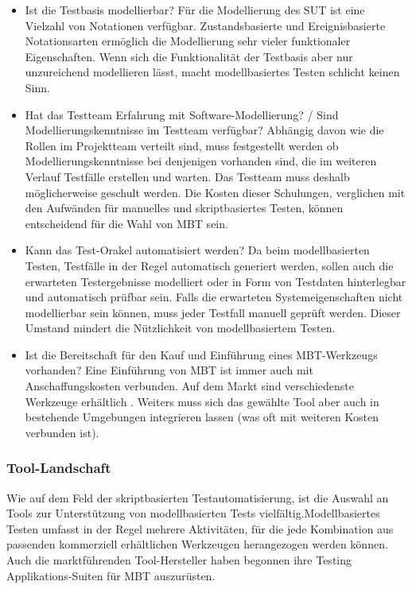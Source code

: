 \begin{itemize}
\item Ist die Testbasis modellierbar?
Für die Modellierung des SUT ist eine Vielzahl von Notationen verfügbar. Zustandsbasierte und Ereignisbasierte  Notationsarten ermöglich die Modellierung sehr vieler funktionaler Eigenschaften. Wenn sich die Funktionalität der Testbasis aber nur unzureichend modellieren lässt, macht modellbasiertes Testen schlicht keinen Sinn.
\item Hat das Testteam Erfahrung mit Software-Modellierung? / Sind Modellierungskenntnisse im Testteam verfügbar?
Abhängig davon wie die Rollen im Projektteam verteilt sind, muss festgestellt werden ob Modellierungskenntnisse bei denjenigen vorhanden sind, die im weiteren Verlauf Testfälle erstellen und warten. Das Testteam muss deshalb möglicherweise geschult werden. Die Kosten dieser Schulungen, verglichen mit den Aufwänden für manuelles und skriptbasiertes Testen, können entscheidend für die Wahl von MBT sein.
\item Kann das Test-Orakel automatisiert werden?
Da beim modellbasierten Testen, Testfälle in der Regel automatisch generiert werden, sollen auch die erwarteten Testergebnisse modelliert oder in Form von Testdaten hinterlegbar und automatisch prüfbar sein. Falls die erwarteten Systemeigenschaften nicht modellierbar sein können, muss jeder Testfall manuell geprüft werden. Dieser Umstand mindert die Nützlichkeit von modellbasiertem Testen.
\item Ist die Bereitschaft für den Kauf und Einführung eines MBT-Werkzeugs vorhanden?
Eine Einführung von MBT ist immer auch mit Anschaffungskosten verbunden. Auf dem Markt sind verschiedenste Werkzeuge erhältlich . Weiters muss sich das gewählte Tool aber auch in bestehende Umgebungen integrieren lassen (was oft mit weiteren Kosten verbunden ist).
\end{itemize}

\subsubsection{Tool-Landschaft}
Wie auf dem Feld der skriptbasierten Testautomatisierung, ist die Auswahl an Tools zur Unterstützung von modellbasierten Tests vielfältig.Modellbasiertes Testen umfasst in der Regel mehrere Aktivitäten, für die jede Kombination aus passenden kommerziell erhältlichen Werkzeugen herangezogen werden können. Auch die marktführenden Tool-Hersteller haben begonnen ihre Testing Applikations-Suiten für MBT auszurüsten. 

